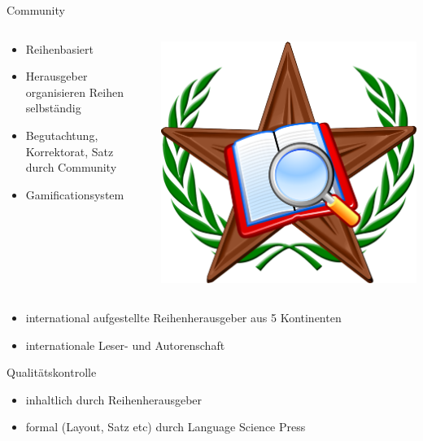 \documentclass[final]{beamer}
\begin{document}
\begin{frame}{}
\begin{columns}[t]
\begin{column}{.45\linewidth}
    \begin{block}{Community}
 \begin{columns}
    \begin{column}{.58\linewidth}
      \begin{itemize}
      \item Reihenbasiert 
      \item Herausgeber organisieren Reihen selbst{\"a}ndig
      \item Begutachtung, Korrektorat, Satz durch Community
      \item Gamificationsystem 
      \end{itemize} 
 \end{column}
    \begin{column}{.38\linewidth}  
\includegraphics[width=.6\textwidth]{barnstar.png} 
 \end{column}
 \end{columns}
      \begin{itemize}
      \item international aufgestellte Reihenherausgeber aus 5 Kontinenten
      \item internationale Leser- und Autorenschaft
      \end{itemize}
    \end{block}
 

    \begin{block}{Qualit{\"a}tskontrolle}
      \begin{itemize}
      \item inhaltlich durch Reihenherausgeber
      \item formal (Layout, Satz etc) durch Language Science Press
      \end{itemize} 
    \end{block}


\end{column}
\end{columns}
\end{frame}
\end{document}
